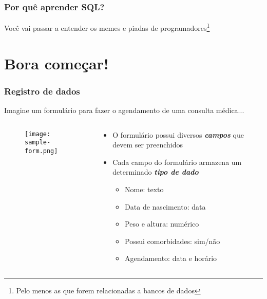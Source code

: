 \documentclass[t, 10pt, aspectratio=169, table, x11names]{beamer}
\begin{document}
	\begin{frame}
		\frametitle{Por quê aprender SQL?}
			Você vai passar a entender os memes e piadas de programadores\footnote{Pelo menos as que forem relacionadas a bancos de dados}
		\reasonboxend
	\end{frame}
	
	\section{Bora começar!}
	
	\begin{frame}
		\frametitle{Registro de dados}
		\vspace{3mm}
		Imagine um formulário para fazer o agendamento de uma consulta médica...
		\begin{columns}[t]
			\begin{column}{0.50\textwidth}
				\vspace{0.3cm}
				\begin{figure}[h]
					\texttt{[image: sample-form.png]}
				\end{figure}
			\end{column}
			\begin{column}{0.53\textwidth}
				\begin{itemize}					
					\item O formulário possui diversos \textit{\textbf{campos}} que devem ser preenchidos
					\vspace{2mm}
					\item Cada campo do formulário armazena um determinado \textit{\textbf{tipo de dado}}
					\vspace{2mm}
					\begin{itemize}
						\ttfamily\small
						\item Nome: texto
						\item Data de nascimento: data
						\item Peso e altura: numérico
						\item Possui comorbidades: sim/não
						\item Agendamento: data e horário
					\end{itemize}
				\end{itemize}
			\end{column}
			\begin{column}{0.05\textwidth}
			\end{column}
		\end{columns}
	\end{frame}
	
\end{document}
